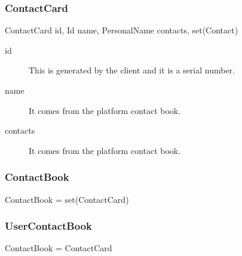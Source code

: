 \documentclass[a4paper,10pt]{article}
\begin{document}
\subsubsection{ContactCard}

\begin{verbbox}
ContactCard
{
  id, Id
  name, PersonalName
  contacts, set(Contact)
}
\end{verbbox}
\begin{center}
\theverbbox
\end{center}

\begin{inparaitem}[ ]
 \item \infrastructure
\end{inparaitem}

\SpecialItem
\begin{description}
 \item[id] This is generated by the client and it is a serial number.
 \item[name] It comes from the platform contact book.
 \item[contacts] It comes from the platform contact book.
\end{description}

\subsubsection{ContactBook}

\begin{verbbox}
ContactBook = set(ContactCard)
\end{verbbox}
\begin{center}
\theverbbox
\end{center}

\begin{inparaitem}[ ]
 \item \persistent
 \item \secure
 \item \unique
\end{inparaitem}

\subsubsection{UserContactBook}

\begin{verbbox}
ContactBook = ContactCard
\end{verbbox}
\begin{center}
\theverbbox
\end{center}
\end{document}
